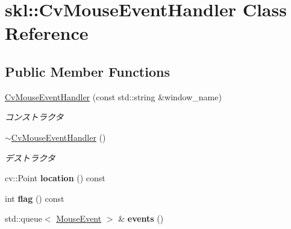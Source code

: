 \hypertarget{classskl_1_1_cv_mouse_event_handler}{}\section{skl\+:\+:Cv\+Mouse\+Event\+Handler Class Reference}
\label{classskl_1_1_cv_mouse_event_handler}
\subsection*{Public Member Functions}
\begin{DoxyCompactItemize}
\item 
\hypertarget{classskl_1_1_cv_mouse_event_handler_ae611ebdede7117727dab439549daee56}{}\label{classskl_1_1_cv_mouse_event_handler_ae611ebdede7117727dab439549daee56} 
\hyperlink{classskl_1_1_cv_mouse_event_handler_ae611ebdede7117727dab439549daee56}{Cv\+Mouse\+Event\+Handler} (const std\+::string \&window\+\_\+name)
\begin{DoxyCompactList}\small\item\em コンストラクタ \end{DoxyCompactList}\item 
\hypertarget{classskl_1_1_cv_mouse_event_handler_a294d6b2bcec7fed58870490a9a7b1c57}{}\label{classskl_1_1_cv_mouse_event_handler_a294d6b2bcec7fed58870490a9a7b1c57} 
\hyperlink{classskl_1_1_cv_mouse_event_handler_a294d6b2bcec7fed58870490a9a7b1c57}{$\sim$\+Cv\+Mouse\+Event\+Handler} ()
\begin{DoxyCompactList}\small\item\em デストラクタ \end{DoxyCompactList}\item 
\hypertarget{classskl_1_1_cv_mouse_event_handler_a989c07ba1c82349a31d1bf6f6fa9ec9b}{}\label{classskl_1_1_cv_mouse_event_handler_a989c07ba1c82349a31d1bf6f6fa9ec9b} 
cv\+::\+Point {\bfseries location} () const
\item 
\hypertarget{classskl_1_1_cv_mouse_event_handler_a9b1982af63fae7634b791453034053dd}{}\label{classskl_1_1_cv_mouse_event_handler_a9b1982af63fae7634b791453034053dd} 
int {\bfseries flag} () const
\item 
\hypertarget{classskl_1_1_cv_mouse_event_handler_afeb529fb49664cad1134dd4812ea810d}{}\label{classskl_1_1_cv_mouse_event_handler_afeb529fb49664cad1134dd4812ea810d} 
std\+::queue$<$ \hyperlink{structskl_1_1_mouse_event}{Mouse\+Event} $>$ \& {\bfseries events} ()
\end{DoxyCompactItemize}
